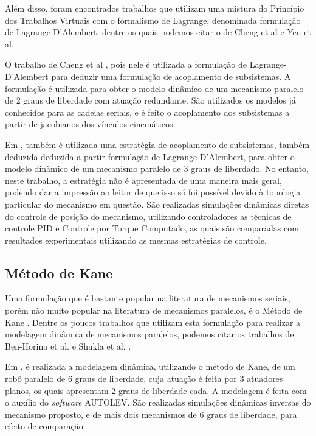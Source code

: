 \documentclass[]{politex}
\begin{document}
Além disso, foram encontrados trabalhos que utilizam uma mistura do Princípio dos Trabalhos Virtuais com o formalismo de Lagrange, denominada formulação de Lagrange-D’Alembert, dentre os quais podemos citar o de Cheng et al \cite{ChengLiu} e Yen et al. \cite{Yen}.

O trabalho de Cheng et al \cite{ChengLiu}, pois nele é utilizada a formulação de Lagrange-D’Alembert para deduzir uma formulação de acoplamento de subsistemas. A formulação é utilizada para obter o modelo dinâmico de um mecanismo paralelo de 2 graus de liberdade com atuação redundante. São utilizados os modelos já conhecidos para as cadeias seriais, e é feito o acoplamento dos subsistemas a partir de jacobianos dos vínculos cinemáticos.

Em \cite{Yen}, também é utilizada uma estratégia de acoplamento de subsistemas, também deduzida deduzida a partir formulação de Lagrange-D’Alembert, para obter o modelo dinâmico de um mecanismo paralelo de 3 graus de liberdado. No entanto, neste trabalho, a estratégia não é apresentada de uma maneira mais geral, podendo dar a impressão ao leitor de que isso só foi possível devido à topologia particular do mecanismo em questão. São realizadas simulações dinâmicas diretas do controle de posição do mecanismo, utilizando controladores as técnicas de controle PID e Controle por Torque Computado, as quais são comparadas com resultados experimentais utilizando as mesmas estratégias de controle.

\subsection{Método de Kane}

Uma formulação que é bastante popular na literatura de mecanismos seriais, porém não muito popular na literatura de mecanismos paralelos, é o Método de Kane \cite{Kane}. Dentre os poucos trabalhos que utilizam esta formulação para realizar a modelagem dinâmica de mecanismos paralelos, podemos citar os trabalhos de Ben-Horina et al. \cite{BenHorina} e Shukla et al. \cite{Shukla}.

Em \cite{BenHorina}, é realizada a modelagem dinâmica, utilizando o método de Kane, de um robô paralelo de 6 graus de liberdade, cuja atuação é feita por 3 atuadores planos, os quais apresentam 2 graus de liberdade cada. A modelagem é feita com o auxílio do \emph{software} AUTOLEV. São realizadas simulações dinâmicas inversas do mecanismo proposto, e de mais dois mecanismos de 6 graus de liberdade, para efeito de comparação.
\end{document}
